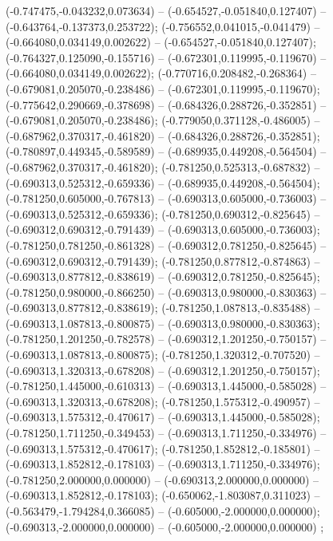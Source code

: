  (-0.747475,-0.043232,0.073634) -- (-0.654527,-0.051840,0.127407) -- (-0.643764,-0.137373,0.253722);
 (-0.756552,0.041015,-0.041479) -- (-0.664080,0.034149,0.002622) -- (-0.654527,-0.051840,0.127407);
 (-0.764327,0.125090,-0.155716) -- (-0.672301,0.119995,-0.119670) -- (-0.664080,0.034149,0.002622);
 (-0.770716,0.208482,-0.268364) -- (-0.679081,0.205070,-0.238486) -- (-0.672301,0.119995,-0.119670);
 (-0.775642,0.290669,-0.378698) -- (-0.684326,0.288726,-0.352851) -- (-0.679081,0.205070,-0.238486);
 (-0.779050,0.371128,-0.486005) -- (-0.687962,0.370317,-0.461820) -- (-0.684326,0.288726,-0.352851);
 (-0.780897,0.449345,-0.589589) -- (-0.689935,0.449208,-0.564504) -- (-0.687962,0.370317,-0.461820);
 (-0.781250,0.525313,-0.687832) -- (-0.690313,0.525312,-0.659336) -- (-0.689935,0.449208,-0.564504);
 (-0.781250,0.605000,-0.767813) -- (-0.690313,0.605000,-0.736003) -- (-0.690313,0.525312,-0.659336);
 (-0.781250,0.690312,-0.825645) -- (-0.690312,0.690312,-0.791439) -- (-0.690313,0.605000,-0.736003);
 (-0.781250,0.781250,-0.861328) -- (-0.690312,0.781250,-0.825645) -- (-0.690312,0.690312,-0.791439);
 (-0.781250,0.877812,-0.874863) -- (-0.690313,0.877812,-0.838619) -- (-0.690312,0.781250,-0.825645);
 (-0.781250,0.980000,-0.866250) -- (-0.690313,0.980000,-0.830363) -- (-0.690313,0.877812,-0.838619);
 (-0.781250,1.087813,-0.835488) -- (-0.690313,1.087813,-0.800875) -- (-0.690313,0.980000,-0.830363);
 (-0.781250,1.201250,-0.782578) -- (-0.690312,1.201250,-0.750157) -- (-0.690313,1.087813,-0.800875);
 (-0.781250,1.320312,-0.707520) -- (-0.690313,1.320313,-0.678208) -- (-0.690312,1.201250,-0.750157);
 (-0.781250,1.445000,-0.610313) -- (-0.690313,1.445000,-0.585028) -- (-0.690313,1.320313,-0.678208);
 (-0.781250,1.575312,-0.490957) -- (-0.690313,1.575312,-0.470617) -- (-0.690313,1.445000,-0.585028);
 (-0.781250,1.711250,-0.349453) -- (-0.690313,1.711250,-0.334976) -- (-0.690313,1.575312,-0.470617);
 (-0.781250,1.852812,-0.185801) -- (-0.690313,1.852812,-0.178103) -- (-0.690313,1.711250,-0.334976);
 (-0.781250,2.000000,0.000000) -- (-0.690313,2.000000,0.000000) -- (-0.690313,1.852812,-0.178103);
 (-0.650062,-1.803087,0.311023) -- (-0.563479,-1.794284,0.366085) -- (-0.605000,-2.000000,0.000000);
 (-0.690313,-2.000000,0.000000) -- (-0.605000,-2.000000,0.000000) ;
